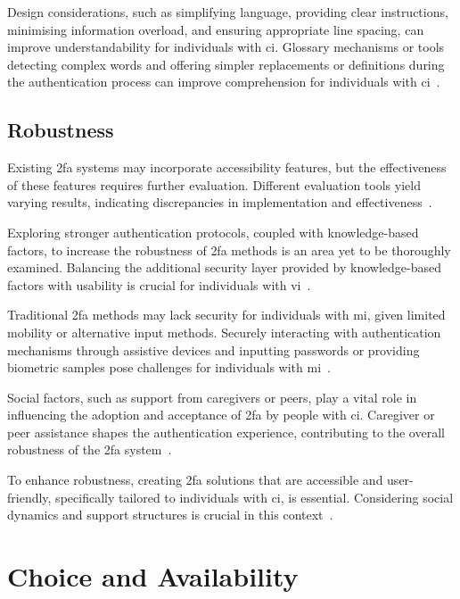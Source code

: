 Design considerations, such as simplifying language, providing clear instructions, minimising information overload, and ensuring appropriate line spacing, can improve understandability for individuals with \ac{ci}. Glossary mechanisms or tools detecting complex words and offering simpler replacements or definitions during the authentication process can improve comprehension for individuals with \ac{ci}~\cite{moreno_2023}.

\subsection{Robustness}
\label{sec:challenges:robustness}

Existing \ac{2fa} systems may incorporate accessibility features, but the effectiveness of these features requires further evaluation. Different evaluation tools yield varying results, indicating discrepancies in implementation and effectiveness~\cite{ismailova_2022}.

Exploring stronger authentication protocols, coupled with knowledge-based factors, to increase the robustness of \ac{2fa} methods is an area yet to be thoroughly examined. Balancing the additional security layer provided by knowledge-based factors with usability is crucial for individuals with \ac{vi}~\cite{chen_2015}.

Traditional \ac{2fa} methods may lack security for individuals with \ac{mi}, given limited mobility or alternative input methods. Securely interacting with authentication mechanisms through assistive devices and inputting passwords or providing biometric samples pose challenges for individuals with \ac{mi}~\cite{kumar_2019}.

Social factors, such as support from caregivers or peers, play a vital role in influencing the adoption and acceptance of \ac{2fa} by people with \ac{ci}. Caregiver or peer assistance shapes the authentication experience, contributing to the overall robustness of the \ac{2fa} system~\cite{erinola_2023}.

To enhance robustness, creating \ac{2fa} solutions that are accessible and user-friendly, specifically tailored to individuals with \ac{ci}, is essential. Considering social dynamics and support structures is crucial in this context~\cite{erinola_2023}.

\section{Choice and Availability}
\label{sec:choice}

